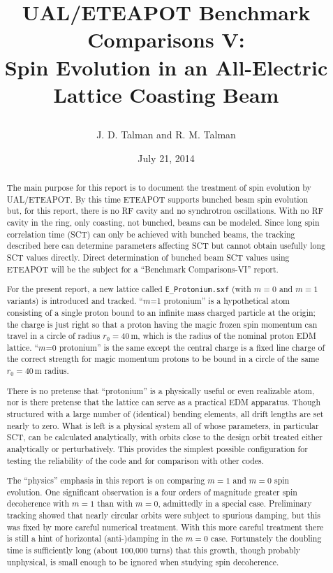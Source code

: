 \documentclass[]{article}
\begin{document}
\date{July 21, 2014}

\title{
\centerline{}
\centerline{}
\centerline{}
UAL/ETEAPOT Benchmark Comparisons V: \\ 
Spin Evolution in an All-Electric Lattice
Coasting Beam}
\author{J. D. Talman and R. M. Talman
}

\maketitle

%
\begin{abstract}
The main purpose for this report is to document the treatment of
spin evolution by UAL/ETEAPOT. By this time ETEAPOT supports
bunched beam spin evolution but, for this report, there is
no RF cavity and no synchrotron oscillations. With no RF cavity in 
the ring, only coasting, not bunched, beams can be modeled. 
Since long spin correlation time (SCT) can only be achieved with 
bunched beams, the tracking described here can determine parameters 
affecting 
SCT but cannot obtain usefully long SCT values directly. Direct 
determination of bunched beam SCT values using ETEAPOT will be 
the subject for a ``Benchmark Comparisons-VI'' report.

For the present report, a new lattice called {\tt E\_Protonium.sxf}
(with $m=0$ and $m=1$ variants) is introduced and tracked.
``$m$=1 protonium'' is a hypothetical atom consisting of a 
single proton bound to an infinite mass charged particle at the 
origin; the charge is just right so that a proton having the 
magic frozen spin momentum can travel in a circle of radius $r_0=40\,$m, 
which is the radius of the nominal proton EDM lattice. 
``$m$=0 protonium'' is the same except the central charge is a fixed
line charge of the correct strength for magic momentum protons
to be bound in a circle of the same $r_0=40\,$m radius.

There is no pretense that ``protonium'' is a physically useful
or even realizable atom, nor is there pretense that the
lattice can serve as a practical EDM apparatus.
Though structured with a large number of (identical) bending 
elements, all drift lengths are set nearly to zero. What is left
is a physical system all of whose parameters, in particular
SCT, can be calculated analytically, with orbits close to the
design orbit treated either analytically or perturbatively. 
This provides the
simplest possible configuration for testing the reliability
of the code and for comparison with other codes.

The ``physics'' emphasis in this report is on comparing $m=1$ and $m=0$
spin evolution. One significant observation is a four orders
of magnitude greater spin decoherence with $m=1$ than with $m=0$,
admittedly in a special case. Preliminary tracking showed that
nearly circular orbits were subject to spurious damping, but this
was fixed by more careful numerical treatment. With this
more careful treatment there is still a hint of horizontal
(anti-)damping in the $m=0$ case. Fortunately the doubling 
time is sufficiently long (about 100,000 turns) that this growth,
though probably unphysical, is small enough to be ignored 
when studying spin decoherence.
\end{abstract}
%
\end{document}

